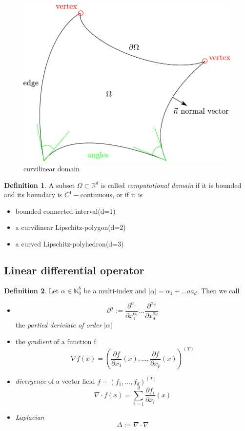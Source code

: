 \documentclass[english]{article}
\theoremstyle{definition}
\newtheorem*{defi}{Definition}
\theoremstyle{remark}
\newcommand{\f}[2]{\frac{#1}{#2}}							%
\newcommand{\p}{\partial}
\newcommand{\NN}{\mathbb{N}}			%
\newcommand{\RR}{\mathbb{R}}			%
\renewcommand{\aa}{\alpha}		%
\newcommand{\OO}{\Omega}
\newcommand{\tri}{\nabla}
\begin{document}
\begin{figure}[H]
  \begin{center}
    \includegraphics[width=\textwidth]{figs/curvilinear.pdf}
  \end{center}
  \caption{curvilinear domain}
  \label{curvilinear-domain-figure}
\end{figure}

\begin{defi}
  A subset $\OO\subset \RR^d$ is called \emph{computational  domain}  if it is bounded and its boundary is $C^1-$continuous, or if it is 
  \begin{itemize}
  \item bounded connected interval(d=1)
  \item a curvilinear Lipschitz-polygon(d=2)
  \item a curved Lipschitz-polyhedron(d=3)
  \end{itemize}
\end{defi}
\subsection{Linear differential operator}
\begin{defi}
  Let $\aa \in \NN_0 ^b$ be a multi-index and $|\aa| = \aa_1+...aa_d$. Then we call 
  \begin{itemize}
  \item $$\p^\aa:=\f{\p^{\aa_1}}{\p x_1^{\aa_1}}...\f{\p^{\aa_d}}{\p x_d^{\aa_d}}$$
    the \emph{partied deriviate of order} $|\aa|$\\
  \item the \emph{gradient} of a function f 
    $$\nabla f (x) = (\f{\p f}{\p x_1}(x),...,\f{\p f}{\p x_p}(x))^{(T)}$$
  \item \emph{divergence} of a vector field $ f=(f_1,...,f_d)^{(T)}$
    $$\nabla \cdot f(x) = \sum_{i=1}^d \f{\p f_i}{\p x_i}(x)$$
  \item \emph{Laplacian}
    $$\Delta :=\tri \cdot \tri$$
  \end{itemize}
\end{defi}
\end{document}

